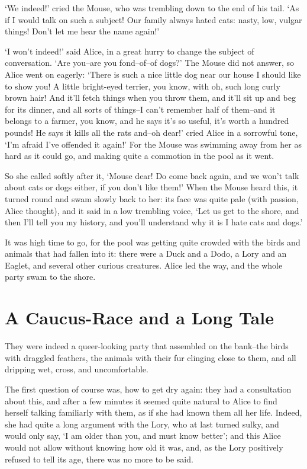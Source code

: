 \documentclass[statementpaper,twoside,openany]{memoir}
\begin{document}
`We indeed!' cried the Mouse, who was trembling down to the end of his tail. `As if I would talk on such a subject! Our family always hated cats: nasty, low, vulgar things! Don't let me hear the name again!'

`I won't indeed!' said Alice, in a great hurry to change the subject of conversation. `Are you--are you fond--of--of dogs?' The Mouse did not answer, so Alice went on eagerly: `There is such a nice little dog near our house I should like to show you! A little bright-eyed terrier, you know, with oh, such long curly brown hair! And it'll fetch things when you throw them, and it'll sit up and beg for its dinner, and all sorts of things--I can't remember half of them--and it belongs to a farmer, you know, and he says it's so useful, it's worth a hundred pounds! He says it kills all the rats and--oh dear!' cried Alice in a sorrowful tone, `I'm afraid I've offended it again!' For the Mouse was swimming away from her as hard as it could go, and making quite a commotion in the pool as it went.

So she called softly after it, `Mouse dear! Do come back again, and we won't talk about cats or dogs either, if you don't like them!' When the Mouse heard this, it turned round and swam slowly back to her: its face was quite pale (with passion, Alice thought), and it said in a low trembling voice, `Let us get to the shore, and then I'll tell you my history, and you'll understand why it is I hate cats and dogs.'

It was high time to go, for the pool was getting quite crowded with the birds and animals that had fallen into it: there were a Duck and a Dodo, a Lory and an Eaglet, and several other curious creatures. Alice led the way, and the whole party swam to the shore.

\chapter{A Caucus-Race and a Long Tale}

They were indeed a queer-looking party that assembled on the bank--the birds with draggled feathers, the animals with their fur clinging close to them, and all dripping wet, cross, and uncomfortable.

The first question of course was, how to get dry again: they had a consultation about this, and after a few minutes it seemed quite natural to Alice to find herself talking familiarly with them, as if she had known them all her life. Indeed, she had quite a long argument with the Lory, who at last turned sulky, and would only say, `I am older than you, and must know better'; and this Alice would not allow without knowing how old it was, and, as the Lory positively refused to tell its age, there was no more to be said.
\end{document}
